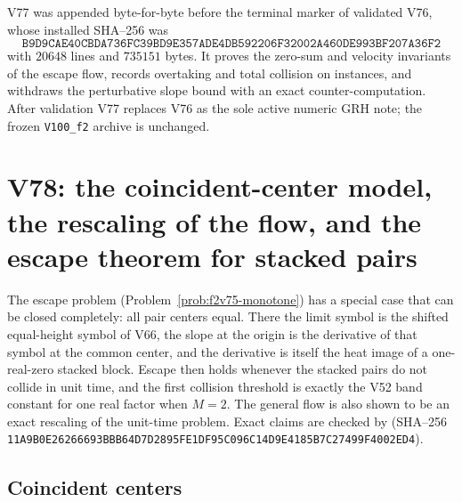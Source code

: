 \documentclass[11pt]{article}
\theoremstyle{definition}
\theoremstyle{remark}
\begin{document}
V77 was appended byte-for-byte before the terminal marker of validated
V76, whose installed SHA--256 was
\[
 \texttt{B9D9CAE40CBDA736FC39BD9E357ADE4D}
 \allowbreak\texttt{B592206F32002A460DE993BF207A36F2}
\]
with \(20648\) lines and \(735151\) bytes.  It proves the zero-sum and
velocity invariants of the escape flow, records overtaking and total
collision on instances, and withdraws the perturbative slope bound with
an exact counter-computation.  After validation V77 replaces V76 as the
sole active numeric GRH note; the frozen \texttt{V100\_f2} archive is
unchanged.





\clearpage
\section{V78: the coincident-center model, the rescaling of the flow, and the escape theorem for stacked pairs}
\label{sec:f2v78-coincident}
\begingroup
\setcounter{equation}{0}
\renewcommand{\theequation}{N78.\arabic{equation}}
\renewcommand{\theHequation}{f2v78.\arabic{equation}}

The escape problem (Problem~\ref{prob:f2v75-monotone}) has a special case
that can be closed completely: all pair centers equal.  There the limit
symbol is the shifted equal-height symbol of V66, the slope at the
origin is the derivative of that symbol at the common center, and the
derivative is itself the heat image of a one-real-zero stacked block.
Escape then holds whenever the stacked pairs do not collide in unit
time, and the first collision threshold is exactly the V52 band constant
for one real factor when \(M=2\).  The general flow is also shown to be
an exact rescaling of the unit-time problem.  Exact claims are checked
by  (SHA--256
\texttt{11A9B0E26266693BBB64D7D2895FE1DF}\allowbreak\texttt{95C096C14D9E4185B7C27499F4002ED4}).

\subsection{Coincident centers}
\end{document}
